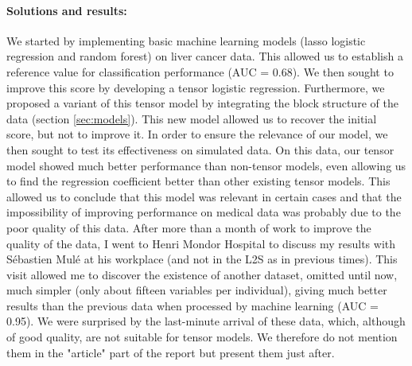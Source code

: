 \documentclass[preprint,12pt]{elsarticle}
\begin{document}
\paragraph*{Solutions and results:} We started by implementing basic machine learning models (lasso logistic regression and random forest) on liver cancer data. This allowed us to establish a reference value for classification performance (AUC = 0.68). We then sought to improve this score by developing a tensor logistic regression. Furthermore, we proposed a variant of this tensor model by integrating the block structure of the data (section \ref{sec:models}). This new model allowed us to recover the initial score, but not to improve it.
\indent In order to ensure the relevance of our model, we then sought to test its effectiveness on simulated data. On this data, our tensor model showed much better performance than non-tensor models, even allowing us to find the regression coefficient better than other existing tensor models. This allowed us to conclude that this model was relevant in certain cases and that the impossibility of improving performance on medical data was probably due to the poor quality of this data. After more than a month of work to improve the quality of the data, I went to Henri Mondor Hospital to discuss my results with Sébastien Mulé at his workplace (and not in the L2S as in previous times). This visit allowed me to discover the existence of another dataset, omitted until now, much simpler (only about fifteen variables per individual), giving much better results than the previous data when processed by machine learning (AUC = 0.95). We were surprised by the last-minute arrival of these data, which, although of good quality, are not suitable for tensor models. We therefore do not mention them in the "article" part of the report but present them just after.




\restoregeometry

\newpage
\tableofcontents
\newpage
\end{document}
